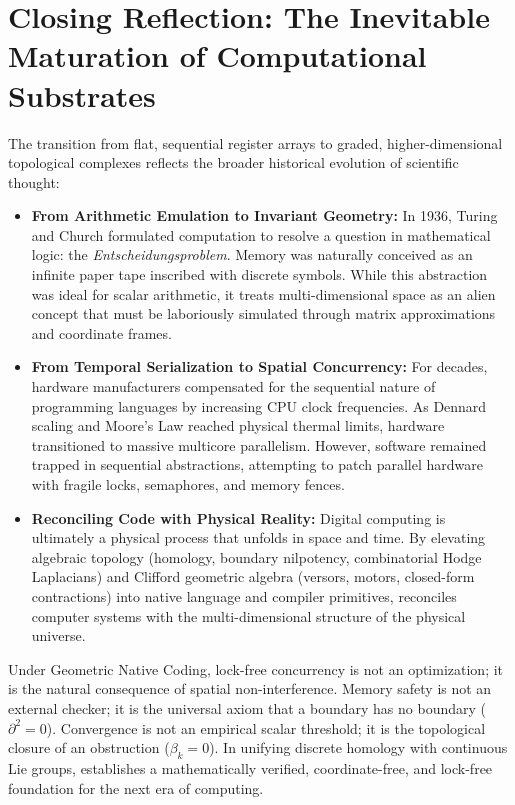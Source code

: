 \section{Closing Reflection: The Inevitable Maturation of Computational Substrates}
\label{sec:closing}

The transition from flat, sequential register arrays to graded, higher-dimensional topological complexes reflects the broader historical evolution of scientific thought:
\begin{itemize}[leftmargin=1.2cm]
    \item \textbf{From Arithmetic Emulation to Invariant Geometry:}  
    In 1936, Turing and Church formulated computation to resolve a question in mathematical logic: the \textit{Entscheidungsproblem}. Memory was naturally conceived as an infinite paper tape inscribed with discrete symbols. While this abstraction was ideal for scalar arithmetic, it treats multi-dimensional space as an alien concept that must be laboriously simulated through matrix approximations and coordinate frames.
    
    \item \textbf{From Temporal Serialization to Spatial Concurrency:}  
    For decades, hardware manufacturers compensated for the sequential nature of programming languages by increasing CPU clock frequencies. As Dennard scaling and Moore's Law reached physical thermal limits, hardware transitioned to massive multicore parallelism. However, software remained trapped in sequential abstractions, attempting to patch parallel hardware with fragile locks, semaphores, and memory fences.

    \item \textbf{Reconciling Code with Physical Reality:}  
    Digital computing is ultimately a physical process that unfolds in space and time. By elevating algebraic topology (homology, boundary nilpotency, combinatorial Hodge Laplacians) and Clifford geometric algebra (versors, motors, closed-form contractions) into native language and compiler primitives, \ToposLang{} reconciles computer systems with the multi-dimensional structure of the physical universe.
\end{itemize}

Under Geometric Native Coding, lock-free concurrency is not an optimization; it is the natural consequence of spatial non-interference. Memory safety is not an external checker; it is the universal axiom that a boundary has no boundary ($\partial^2 = 0$). Convergence is not an empirical scalar threshold; it is the topological closure of an obstruction ($\beta_k = 0$). In unifying discrete homology with continuous Lie groups, \ToposLang{} establishes a mathematically verified, coordinate-free, and lock-free foundation for the next era of computing.

